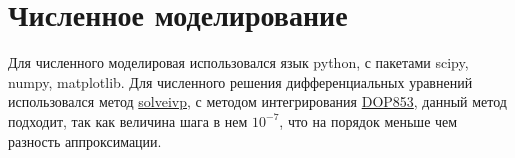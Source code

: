 \documentclass[hoptionsi, twocolumn]{revtex4-2}
\begin{document}
\section{\textbf{Численное моделирование}}

Для численного моделировая использовался язык python, с пакетами scipy, numpy, matplotlib. Для численного решения дифференциальных уравнений использовался метод \href{https://docs.scipy.org/doc/scipy/reference/generated/scipy.integrate.solve_ivp.html}{solveivp}, с методом интегрирования \href{https://docs.scipy.org/doc/scipy/reference/generated/scipy.integrate.solve_ivp.html#r179348322575-1}{DOP853}, данный метод подходит, так как величина шага в нем $10^{-7}$, что на порядок меньше чем разность аппроксимации.
 
\end{document}
